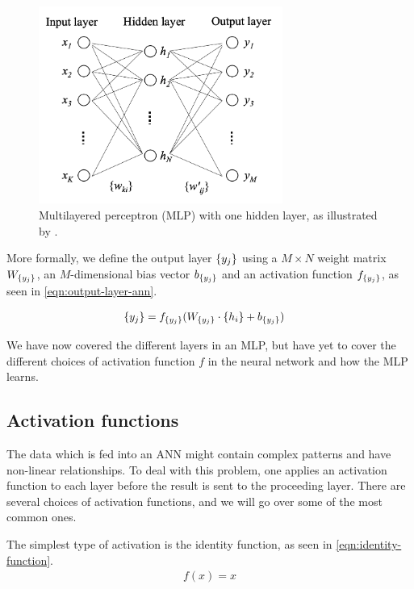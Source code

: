 \begin{figure}[H]
    \centering
    \includegraphics[width=8cm]{thesis/figures/multi-layer-neural-network-one-hidden-rong-2014.png}
    \caption{Multilayered perceptron (MLP) with one hidden layer, as illustrated by \cite[Figure 6]{rong2016word2vec}.}
    \label{fig:mlp-one-hidden}
\end{figure}

More formally, we define the output layer $\left\{ {y}_{j} \right\}$ using a $M \times N$ weight matrix $W_{\left\{ {y}_{j} \right\}}$, an $M$-dimensional bias vector $b_{\left\{ {y}_{j} \right\}}$ and an activation function $f_{\left\{ {y}_{j} \right\}}$, as seen in \cref{eqn:output-layer-ann}.

\begin{align}
    \label{eqn:output-layer-ann}
    \left\{ {y}_{j} \right\} &= f_{\left\{ {y}_{j} \right\}}(W_{\left\{ {y}_{j} \right\}} \cdot \left\{ {h}_{i} \right\} + b_{\left\{ {y}_{j} \right\}})
\end{align}

We have now covered the different layers in an MLP, but have yet to cover the different choices of activation function $f$ in the neural network and how the MLP learns.

\subsection{Activation functions}
\label{sec:activation-functions-ann}
The data which is fed into an ANN might contain complex patterns and have non-linear relationships. To deal with this problem, one applies an activation function to each layer before the result is sent to the proceeding layer. There are several choices of activation functions, and we will go over some of the most common ones.

The simplest type of activation is the identity function, as seen in \cref{eqn:identity-function}.
\begin{align}
    \label{eqn:identity-function}
    f(x) = x
\end{align}


